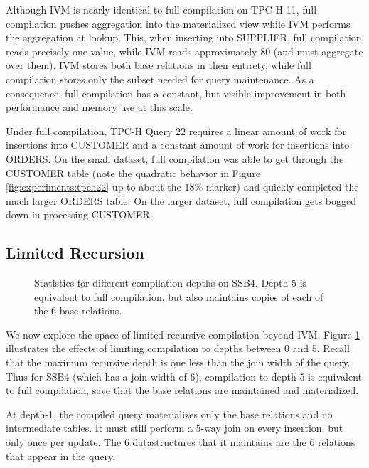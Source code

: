 Although IVM is nearly identical to full compilation on TPC-H 11, full compilation pushes aggregation into the materialized view while IVM performs the aggregation at lookup.  This, when inserting into SUPPLIER, full compilation reads precisely one value, while IVM reads approximately 80 (and must aggregate over them).  IVM stores both base relations in their entirety, while full compilation stores only the subset needed for query maintenance.  As a consequence, full compilation has a constant, but visible improvement in both performance and memory use at this scale.

Under full compilation, TPC-H Query 22 requires a linear amount of work for insertions into CUSTOMER and a constant amount of work for insertions into ORDERS.  On the small dataset, full compilation was able to get through the CUSTOMER table (note the quadratic behavior in Figure \ref{fig:experiments:tpch22} up to about the 18\% marker) and quickly completed the much larger ORDERS table.  On the larger dataset, full compilation gets bogged down in processing CUSTOMER.

\subsection{Limited Recursion}
\label{sec:experiments:othermetrics}

\begin{figure}
\begin{center}

\caption{Statistics for different compilation depths on SSB4.  Depth-5 is equivalent to full compilation, but also maintains copies of each of the 6 base relations.}
\label{fig:experiments:ssb4depth}
\end{center}
\end{figure}
We now explore the space of limited recursive compilation beyond IVM.  Figure \ref{fig:experiments:ssb4depth} illustrates the effects of limiting compilation to depths between 0 and 5.  Recall that the maximum recursive depth is one less than the join width of the query.  Thus for SSB4 (which has a join width of 6), compilation to depth-5 is equivalent to full compilation, save that the base relations are maintained and materialized.

At depth-1, the compiled query materializes only the base relations and no intermediate tables.  It must still perform a 5-way join on every insertion, but  only once per update.  The 6 datastructures that it maintains are the 6 relations that appear in the query.  

